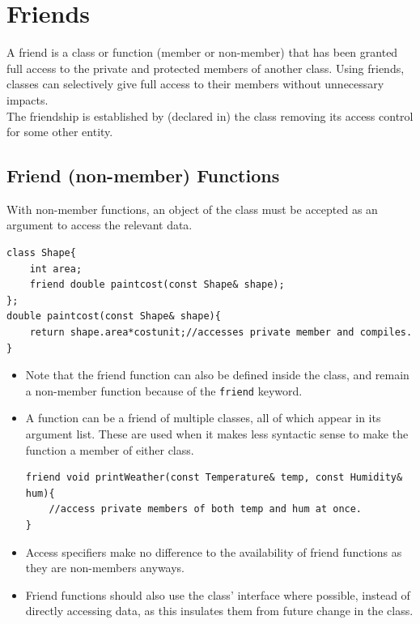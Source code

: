 \documentclass{report}
\begin{document}
\section{Friends}
A friend is a class or function (member or non-member) that has been granted full access to the private and protected members of another class. Using friends, classes can selectively give full access to their members without unnecessary impacts.\\
The friendship is established by (declared in) the class removing its access control for some other entity.
\subsection{Friend (non-member) Functions}
With non-member functions, an object of the class must be accepted as an argument to access the relevant data.
\begin{lstlisting}
class Shape{
    int area;
    friend double paintcost(const Shape& shape);
};
double paintcost(const Shape& shape){
    return shape.area*costunit;//accesses private member and compiles.
}
\end{lstlisting}
\begin{itemize}
\item Note that the friend function can also be defined inside the class, and remain a non-member function because of the \texttt{friend} keyword.
\item A function can be a friend of multiple classes, all of 
which appear in its argument list. These are used when it makes 
less syntactic sense to make the function a member of either 
class.
\begin{lstlisting}
friend void printWeather(const Temperature& temp, const Humidity& hum){
    //access private members of both temp and hum at once.
}
\end{lstlisting}
\item Access specifiers make no difference to the availability of friend functions as they are non-members anyways.
\item Friend functions should also use the class' interface where possible, instead of directly accessing data, as this insulates them from future change in the class.
\end{itemize}
\end{document}
